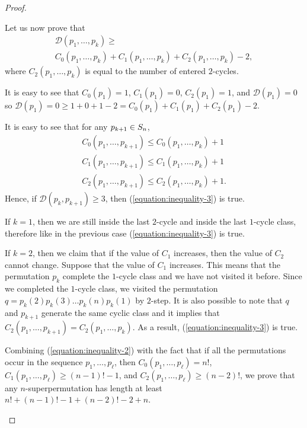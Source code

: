 \begin{proof}
\begin{itemize}
      Let us now prove that
      \begin{multline}
        \label{equation:inequality-3}
        \mathcal{D}(p_1, \dots, p_k) \ge \\
        C_0(p_1, \dots, p_k) + C_1(p_1, \dots, p_k) + C_2(p_1, \dots, p_k) - 2,
      \end{multline}
      where $C_2(p_1, \dots, p_k)$ is equal to the number of entered $2$-cycles.

      It is easy to see that $C_0(p_1) = 1$, $C_1(p_1) = 0$, $C_2(p_1) = 1$, and
      $\mathcal{D}(p_1) = 0$ so
      $\mathcal{D}(p_1) = 0 \ge 1 + 0 + 1 - 2 =
      C_0(p_1) + C_1(p_1) + C_2(p_1)- 2$.

      It is easy to see that for any $p_{k + 1} \in S_{n}$,
      \begin{gather*}
        C_0(p_1, \dots, p_{k + 1}) \le C_0(p_1, \dots, p_k) + 1  \\
        C_1(p_1, \dots, p_{k + 1}) \le C_1(p_1, \dots, p_k) + 1 \\
        C_2(p_1, \dots, p_{k + 1}) \le C_2(p_1, \dots, p_k) + 1.
      \end{gather*}
      Hence, if $\mathcal{D}(p_k, p_{k + 1}) \ge 3$, then
      (\ref{equation:inequality-3}) is true.

      If $k = 1$, then we are still
      inside the last $2$-cycle and inside the last $1$-cycle class, therefore
      like in the previous case (\ref{equation:inequality-3}) is true.

      If $k = 2$, then we claim that if the value of $C_1$ increases, then
      the value of $C_2$ cannot change. Suppose that the value of $C_1$
      increases. This means that the permutation $p_k$ complete the $1$-cycle
      class and we have not visited it before. Since we
      completed the $1$-cycle class, we visited the permutation
      $q = p_k(2) p_k(3) \dots p_k(n) p_k(1)$ by $2$-step.
      It is also possible to note that $q$ and
      $p_{k + 1}$ generate the same cyclic class and it
      implies that $C_2(p_1, \dots, p_{k + 1}) = C_2(p_1, \dots, p_k)$.
      As a result, (\ref{equation:inequality-3}) is true.

      Combining (\ref{equation:inequality-2}) with the
      fact that if all the
      permutations occur in the sequence $p_1, \dots, p_\ell$, then
      $C_0(p_1, \dots, p_\ell) = n!$, $C_1(p_1, \dots, p_\ell) \ge
      (n - 1)! - 1$, and $C_2(p_1, \dots, p_\ell) \ge (n - 2)!$,
      we prove that any $n$-superpermutation has length at least
      $n! + (n - 1)! - 1 + (n - 2)! - 2 + n$.
  \end{itemize}
\end{proof}

